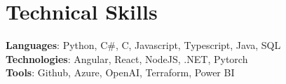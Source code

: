 \documentclass[letterpaper,11pt]{article}
\begin{document}
\section{Technical Skills}
  \begin{itemize}[leftmargin=0.15in, label={}]
    \small{\item{
    {\textbf{Languages}: Python, C\#, C, Javascript, Typescript, Java, SQL}\\
    {\textbf{Technologies}: Angular, React, NodeJS, .NET, Pytorch}\\
    {\textbf{Tools}: Github, Azure, OpenAI, Terraform, Power BI}}}
\end{itemize}
\end{document}
